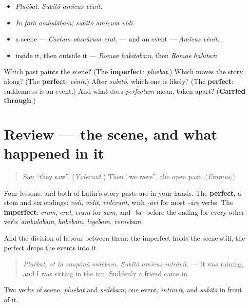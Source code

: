 \begin{itemize}
\raggedright
  \item \emph{Pluēbat. Subitō amīcus vēnit.}
  \item \emph{In forō ambulābam; subitō amīcum vīdī.}
  \item a scene — \emph{Caelum obscūrum erat.} — and an event — \emph{Amīcus vēnit.}
  \item inside it, then outside it — \emph{Rōmae habitābam}, then \emph{Rōmae habitāvī}
\end{itemize}

\begin{tcolorbox}[breakable,colback=teal!4,colframe=teal!35!black,title={Before you move on}]
Which past paints the scene? (The \textbf{imperfect}: \emph{pluēbat}.) Which moves the story along? (The \textbf{perfect}: \emph{vēnit}.) After \emph{subitō}, which one is likely? (The \textbf{perfect}: suddenness is an event.) And what does \emph{perfectum} mean, taken apart? (\textbf{Carried through}.)
\end{tcolorbox}
\section[(review)]{Review — the scene, and what happened in it}

\label{lesson:LA-R281-the-scene-and-the-event}



\begin{quote}
Say \textquotedblleft{}they saw\textquotedblright{}. (\emph{Vīdērunt.}) Then \textquotedblleft{}we were\textquotedblright{}, the open past. (\emph{Erāmus.})
\end{quote}

\begin{grammarlens}[title={What you've built}]
Four lessons, and both of Latin's story pasts are in your hands. The \textbf{perfect}, a stem and six endings: \emph{vīdī}, \emph{vīdit}, \emph{vīdērunt}, with \emph{-āvī} for most \emph{-āre} verbs. The \textbf{imperfect}: \emph{eram}, \emph{erat}, \emph{erant} for \emph{sum}, and \emph{-ba-} before the ending for every other verb: \emph{ambulābam}, \emph{habēbam}, \emph{legēbam}, \emph{veniēbam}.

And the division of labour between them: the imperfect holds the scene still, the perfect drops the events into it.

\begin{quote}
\emph{Pluēbat, et in caupōnā sedēbam. Subitō amīcus intrāvit.} — It was raining, and I was sitting in the inn. Suddenly a friend came in.
\end{quote}

Two verbs of scene, \emph{pluēbat} and \emph{sedēbam}; one event, \emph{intrāvit}, and \emph{subitō} in front of it.
\end{grammarlens}

